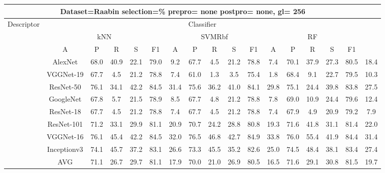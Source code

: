 \documentclass[12pt,italian]{article}
\begin{document}
\begin{tiny}
\begin{longtable}{lcccccccccccccccc}
\toprule
\multicolumn{16}{c}{Dataset=Raabin selection=\% prepro= none postpro= none, gl= 256} \\ 
\toprule
Descriptor & \multicolumn{15}{c}{Classifier} \\ 
& \multicolumn{5}{c}{kNN} & \multicolumn{5}{c}{SVMRbf} & \multicolumn{5}{c}{RF} \\ 
& A & P & R & S & F1 & A & P & R & S & F1 & A & P & R & S & F1 \\ 
\midrule
& AlexNet & 68.0 & 40.9 & 22.1 & 79.0 &  9.2 & 67.7 &  4.5 & 21.2 & 78.8 &  7.4 & 70.1 & 37.9 & 27.3 & 80.5 & 18.4 \\ 
& VGGNet-19 & 67.7 &  4.5 & 21.2 & 78.8 &  7.4 & 61.0 &  1.3 &  3.5 & 75.4 &  1.8 & 68.4 &  9.1 & 22.7 & 79.5 & 10.3 \\ 
& ResNet-50 & 76.1 & 34.1 & 42.2 & 84.5 & 31.4 & 75.6 & 36.2 & 41.0 & 84.1 & 29.8 & 75.1 & 24.4 & 39.8 & 83.8 & 27.5 \\ 
& GoogleNet & 67.8 &  5.7 & 21.5 & 78.9 &  8.5 & 67.7 &  4.8 & 21.2 & 78.8 &  7.8 & 69.0 & 10.9 & 24.4 & 79.6 & 12.4 \\ 
& ResNet-18 & 67.7 &  4.5 & 21.2 & 78.8 &  7.4 & 67.7 &  4.5 & 21.2 & 78.8 &  7.4 & 67.9 &  4.9 & 20.9 & 79.2 &  7.9 \\ 
& ResNet-101 & 71.2 & 33.1 & 29.9 & 81.1 & 20.9 & 70.7 & 24.2 & 28.8 & 80.8 & 19.3 & 71.6 & 41.8 & 31.1 & 81.4 & 22.0 \\ 
& VGGNet-16 & 76.1 & 45.4 & 42.2 & 84.5 & 32.0 & 76.5 & 46.8 & 42.7 & 84.9 & 33.8 & 76.0 & 55.4 & 41.9 & 84.4 & 31.4 \\ 
& Inceptionv3 & 74.1 & 45.7 & 37.2 & 83.1 & 26.6 & 73.3 & 45.5 & 35.2 & 82.6 & 25.0 & 74.5 & 48.4 & 38.1 & 83.4 & 27.4 \\ 
\hline
& AVG & 71.1 & 26.7 & 29.7 & 81.1 & 17.9 & 70.0 & 21.0 & 26.9 & 80.5 & 16.5 & 71.6 & 29.1 & 30.8 & 81.5 & 19.7 \\ 
\hline
\bottomrule
\end{longtable} 

 \pagebreak 
\end{tiny} 
 
\end{document}
